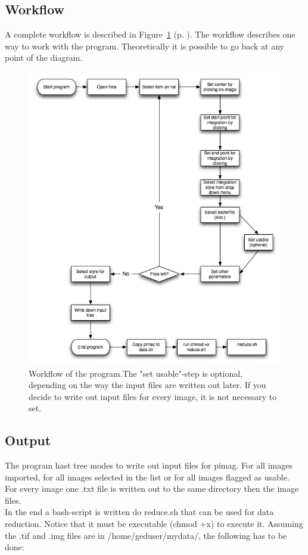 \subsection{Workflow}
A complete workflow is described in Figure~\ref{workflow} (p. \pageref{workflow}). The workflow describes one way to work with the program. Theoretically it is possible to go back at any point of the diagram. 

\begin{figure}
\includegraphics[width=12cm]{diagram}
\caption{Workflow of the program.The "set usable"-step is optional, depending on the way the input files are written out later. If you decide to write out input files for every image, it is not necessary to set.  }
\label{workflow} 
\end{figure} 

\subsection{Output}
The program hast tree modes to write out input files for pimag. For all images imported, for all images selected in the list or for all images flagged as usable. \\
For every image one .txt file is written out to the same directory then the image files. \\
In the end a bash-script is written do reduce.sh that can be used for data reduction. Notice that it must be executable (chmod +x) to execute it. Assuming the .tif and .img files are in /home/geduser/mydata/, the following has to be done: \\

